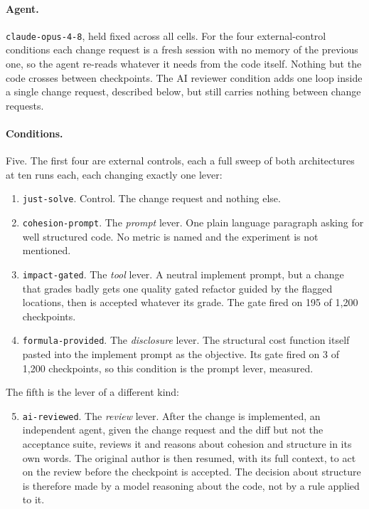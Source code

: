 \documentclass[11pt,a4paper]{article}
\begin{document}
\paragraph{Agent.} \texttt{claude-opus-4-8}, held fixed across all cells. For
the four external-control conditions each change request is a fresh session with
no memory of the previous one, so the agent re-reads whatever it needs from the
code itself. Nothing but the code crosses between checkpoints. The AI reviewer
condition adds one loop inside a single change request, described below, but
still carries nothing between change requests.

\paragraph{Conditions.} Five. The first four are external controls, each a full
sweep of both architectures at ten runs each, each changing exactly one lever:

\begin{enumerate}
\item \texttt{just-solve}. Control. The change request and nothing else.
\item \texttt{cohesion-prompt}. The \emph{prompt} lever. One plain language
  paragraph asking for well structured code. No metric is named and the
  experiment is not mentioned.
\item \texttt{impact-gated}. The \emph{tool} lever. A neutral implement prompt,
  but a change that grades badly gets one quality gated refactor guided by the
  flagged locations, then is accepted whatever its grade. The gate fired on 195
  of 1{,}200 checkpoints.
\item \texttt{formula-provided}. The \emph{disclosure} lever. The structural
  cost function itself pasted into the implement prompt as the objective. Its
  gate fired on 3 of 1{,}200 checkpoints, so this condition is the prompt
  lever, measured.
\end{enumerate}

\noindent The fifth is the lever of a different kind:

\begin{enumerate}
\setcounter{enumi}{4}
\item \texttt{ai-reviewed}. The \emph{review} lever. After the change is
  implemented, an independent agent, given the change request and the diff but
  not the acceptance suite, reviews it and reasons about cohesion and structure
  in its own words. The original author is then resumed, with its full context,
  to act on the review before the checkpoint is accepted. The decision about
  structure is therefore made by a model reasoning about the code, not by a rule
  applied to it.
\end{enumerate}
\end{document}
